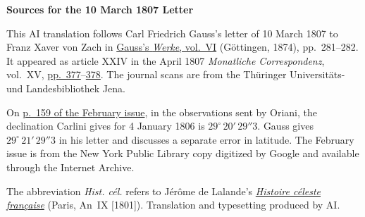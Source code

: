 \clearpage\thispagestyle{empty}
\begin{center}\textbf{Sources for the 10 March 1807 Letter}\end{center}
\noindent This AI translation follows Carl Friedrich Gauss’s letter of 10 March 1807 to Franz Xaver von Zach in \href{https://gdz.sub.uni-goettingen.de/id/PPN236007467}{Gauss’s \textit{Werke}, vol.~VI} (Göttingen, 1874), pp.~281--282. It appeared as article XXIV in the April 1807 \textit{Monatliche Correspondenz}, vol.~XV, \href{https://zs.thulb.uni-jena.de/rsc/viewer/jportal_derivate_00237836/Monatliche_Correspondenz_130168688_15_1807_0380.tif}{pp.~377}--\href{https://zs.thulb.uni-jena.de/rsc/viewer/jportal_derivate_00237836/Monatliche_Correspondenz_130168688_15_1807_0381.tif}{378}. The journal scans are from the Thüringer Universitäts- und Landesbibliothek Jena.
\par\medskip
On \href{https://archive.org/details/bub_gb_sKAAAAAAMAAJ/page/n164/mode/1up}{p.~159 of the February issue}, in the observations sent by Oriani, the declination Carlini gives for 4 January 1806 is $29^\circ\,20'\,29''3$. Gauss gives $29^\circ\,21'\,29''3$ in his letter and discusses a separate error in latitude. The February issue is from the New York Public Library copy digitized by Google and available through the Internet Archive.
\par\medskip
The abbreviation \emph{Hist. cél.} refers to Jérôme de Lalande’s \href{https://archive.org/download/histoireclestef00lalagoog/page/n12.jpg}{\textit{Histoire céleste française}} (Paris, An~IX [1801]). Translation and typesetting produced by AI.
\clearpage
